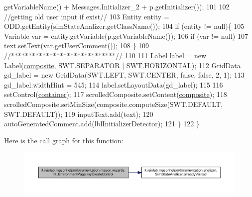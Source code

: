 \begin{DoxyCode}
      getVariableName() + Messages.Initializer\_2 + p.getInitializer());
101             
102             \textcolor{comment}{//getting old user input if exist//}
103             Entity entity = ODD.getEntity(simStateAnalizer.getClassName());
104             \textcolor{keywordflow}{if} (entity != null)\{
105                 Variable var = entity.getVariable(p.getVariableName());
106                 \textcolor{keywordflow}{if} (var != null)
107                     text.setText(var.getUserComment());
108             \}
109             \textcolor{comment}{//******************************//}
110             
111             Label label = \textcolor{keyword}{new} Label(\hyperlink{classit_1_1isislab_1_1masonhelperdocumentation_1_1mason_1_1wizards_1_1_h___environment_page_acd16b35445be03e0527a45d03cf61573}{composite}, SWT.SEPARATOR | SWT.HORIZONTAL);
112             GridData gd\_label = \textcolor{keyword}{new} GridData(SWT.LEFT, SWT.CENTER, \textcolor{keyword}{false}, \textcolor{keyword}{false}, 2, 1);
113             gd\_label.widthHint = 545;
114             label.setLayoutData(gd\_label);
115             
116             setControl(\hyperlink{classit_1_1isislab_1_1masonhelperdocumentation_1_1mason_1_1wizards_1_1_h___environment_page_ae24bc5d12a792cdda1cba4f0b66f1c4c}{container});
117             scrolledComposite.setContent(\hyperlink{classit_1_1isislab_1_1masonhelperdocumentation_1_1mason_1_1wizards_1_1_h___environment_page_acd16b35445be03e0527a45d03cf61573}{composite});
118             scrolledComposite.setMinSize(composite.computeSize(SWT.DEFAULT, SWT.DEFAULT));  
119             inputText.add(text);
120             autoGeneratedComment.add(lblInitializerDetector);
121         \}
122     \}
\end{DoxyCode}


Here is the call graph for this function\-:\nopagebreak
\begin{figure}[H]
\begin{center}
\leavevmode
\includegraphics[width=350pt]{classit_1_1isislab_1_1masonhelperdocumentation_1_1mason_1_1wizards_1_1_h___environment_page_a09a8404f1e96b68ec8bcb29a3da65558_cgraph}
\end{center}
\end{figure}




